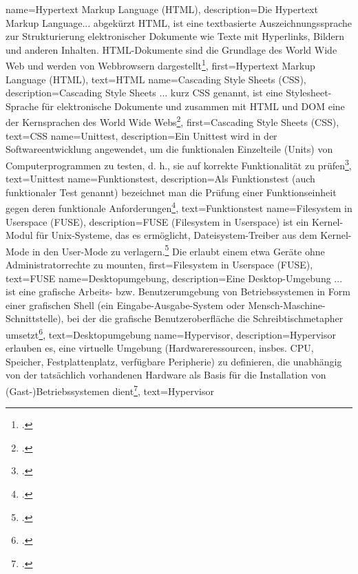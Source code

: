 {
    name={Hypertext Markup Language (HTML)},
    description={Die Hypertext Markup Language... abgekürzt HTML, ist eine textbasierte
      Auszeichnungssprache zur Strukturierung elektronischer Dokumente wie Texte mit
      Hyperlinks, Bildern und anderen Inhalten. HTML-Dokumente sind die Grundlage des
      World Wide Web und werden von Webbrowsern dargestellt\footcite{html}},
    first={Hypertext Markup Language (HTML)},
    text={HTML}
}
{
    name={Cascading Style Sheets (CSS)},
    description={Cascading Style Sheets ... kurz CSS genannt, ist
      eine Stylesheet-Sprache für elektronische Dokumente und zusammen mit HTML und
      DOM eine der Kernsprachen des World Wide Webs\footcite{css}},
    first={Cascading Style Sheets (CSS)},
    text={CSS}
}
{
    name={Unittest},
    description={Ein Unittest wird in der Softwareentwicklung angewendet, um
      die funktionalen Einzelteile (Units) von Computerprogrammen zu testen, d. h.,
      sie auf korrekte Funktionalität zu prüfen\footcite{unittest}},
    text={Unittest}
}
{
    name={Funktionstest},
    description={Als Funktionstest (auch funktionaler Test genannt) bezeichnet
      man die Prüfung einer Funktionseinheit gegen deren funktionale
      Anforderungen\footcite{funktionstest}},
    text={Funktionstest}
}
{
    name={Filesystem in Userspace (FUSE)},
    description={FUSE (Filesystem in Userspace) ist ein Kernel-Modul für
      Unix-Systeme, das es ermöglicht, Dateisystem-Treiber aus dem Kernel-Mode in den
      User-Mode zu verlagern.\footcite{fuse} Die erlaubt einem etwa Geräte ohne
      Administratorrechte zu mounten},
    first={Filesystem in Userspace (FUSE)},
    text={FUSE}
}
{
    name={Desktopumgebung},
    description={Eine Desktop-Umgebung ... ist eine grafische Arbeits- bzw.
      Benutzerumgebung von Betriebssystemen in Form einer grafischen Shell (ein
      Eingabe-Ausgabe-System oder Mensch-Maschine-Schnittstelle), bei der die
      grafische Benutzeroberfläche die Schreibtischmetapher
      umsetzt\footcite{desktopumgebung}},
    text={Desktopumgebung}
}
{
    name={Hypervisor},
    description={Hypervisor erlauben es, eine virtuelle Umgebung
      (Hardwareressourcen, insbes. CPU, Speicher, Festplattenplatz, verfügbare
      Peripherie) zu definieren, die unabhängig von der tatsächlich vorhandenen
      Hardware als Basis für die Installation von (Gast-)Betriebssystemen
      dient\footcite{hypervisor}},
    text={Hypervisor}
}

